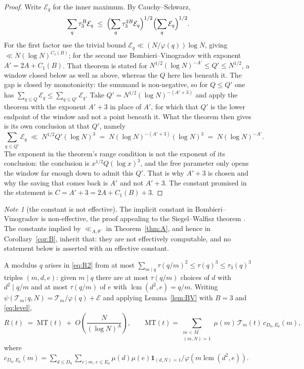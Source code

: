 \documentclass[11pt,a4paper]{article}
\theoremstyle{plain}
\theoremstyle{definition}
\theoremstyle{remark}
\newtheorem{note}[theorem]{Note}
\newcommand{\Tcut}{\mathcal T}
\DeclareMathOperator{\lcm}{lcm}
\begin{document}
\begin{proof}
Write $\mathcal E_q$ for the inner maximum. By Cauchy--Schwarz,
\[
  \sum_q\tau_3^B\mathcal E_q
  \;\le\;\Bigl(\sum_q\tau_3^{2B}\mathcal E_q\Bigr)^{1/2}
         \Bigl(\sum_q\mathcal E_q\Bigr)^{1/2}.
\]
For the first factor use the trivial bound
$\mathcal E_q\ll(N/\varphi(q))\log N$, giving $\ll N(\log N)^{C_1(B)}$;
for the second use Bombieri--Vinogradov \cite{MoV2} with exponent
$A'=2A+C_1(B)$. That theorem is stated for
$N^{1/2}(\log N)^{-A'}\le Q'\le N^{1/2}$, a window closed below as well
as above, whereas the $Q$ here lies beneath it. The gap is closed by
monotonicity: the summand is non-negative, so for $Q\le Q'$ one has
$\sum_{q\le Q}\mathcal E_q\le\sum_{q\le Q'}\mathcal E_q$. Take
$Q'=N^{1/2}(\log N)^{-(A'+3)}$ and apply the theorem with the exponent
$A'+3$ in place of $A'$, for which that $Q'$ is the lower endpoint of
the window and not a point beneath it. What the theorem then gives is
its own conclusion at that $Q'$, namely
\[
  \sum_{q\le Q'}\mathcal E_q\;\ll\;N^{1/2}Q'(\log N)^{3}
  \;=\;N(\log N)^{-(A'+3)}(\log N)^{3}\;=\;N(\log N)^{-A'} .
\]
The exponent in the theorem's range condition is not the exponent of
its conclusion: the conclusion is $x^{1/2}Q(\log x)^{3}$, and the
free parameter only opens the window far enough down to admit this
$Q'$. That is why $A'+3$ is chosen and why the saving that comes back
is $A'$ and not $A'+3$. The constant promised in the statement is
$C=A'+3=2A+C_1(B)+3$.
\end{proof}

\begin{note}[the constant is not effective]\label{note:noneffective}
The implicit constant in Bombieri--Vinogradov is non-effective, the
proof appealing to the Siegel--Walfisz theorem \cite{MoV2}. The
constants implied by $\ll_{A,\theta'}$ in Theorem~\ref{thm:A}, and
hence in Corollary~\ref{cor:B}, inherit that: they are not effectively
computable, and no statement below is asserted with an effective
constant.
\end{note}

A modulus $q$ arises in \eqref{eq:R2} from at most
$\sum_{m\mid q}\tau(q/m)^2\le\tau(q)^3\le\tau_3(q)^3$ triples
$(m,d,e)$: given $m\mid q$ there are at most $\tau(q/m)$ choices of
$d$ with $d^2\mid q/m$ and at most $\tau(q/m)$ of $e$ with
$\lcm(d^2,e)=q/m$. Writing $\psi(\Tcut_m;q,N)=\Tcut_m/\varphi(q)+\mathcal E$
and applying Lemma~\ref{lem:BV} with $B=3$ and \eqref{eq:level},
\begin{equation}\label{eq:R3}
  R(t)\;=\;\mathrm{MT}(t)\;+\;O\!\left(\frac{N}{(\log N)^{A}}\right),
  \qquad
  \mathrm{MT}(t)=\sum_{\substack{m<M\\ (m,N)=1}}
       \mu(m)\,\Tcut_m(t)\,c_{D_0,E_0}(m),
\end{equation}
where
$c_{D_0,E_0}(m)=\sum_{d\le D_0}\sum_{e\mid m,\,e\le E_0}
\mu(d)\mu(e)\mathbf 1_{(d,N)=1}/\varphi(m\lcm(d^2,e))$.
\end{document}
